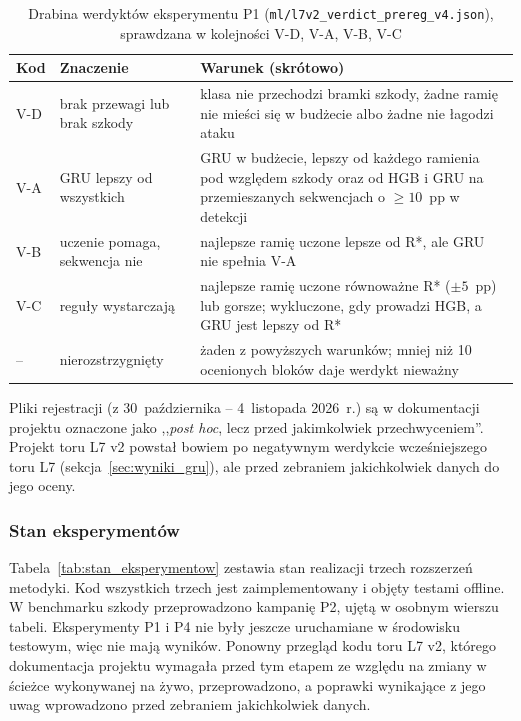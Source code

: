 \documentclass[a4paper,12pt]{article}
\begin{document}
\begin{table}[H]
\centering
\small
\caption{Drabina werdyktów eksperymentu P1 (\texttt{ml/l7v2\_verdict\_prereg\_v4.json}), sprawdzana w kolejności V-D, V-A, V-B, V-C}\label{tab:p1_werdykty}
\begin{tabularx}{\linewidth}{@{}L{1.0cm}L{4.0cm}Y@{}}
\toprule
Kod & Znaczenie & Warunek (skrótowo) \\
\midrule
V-D & brak przewagi lub brak szkody & klasa nie przechodzi bramki szkody, żadne ramię nie mieści się w budżecie albo żadne nie łagodzi ataku \\
V-A & GRU lepszy od wszystkich & GRU w budżecie, lepszy od każdego ramienia pod względem szkody oraz od HGB i GRU na przemieszanych sekwencjach o $\geq 10$~pp w detekcji \\
V-B & uczenie pomaga, sekwencja nie & najlepsze ramię uczone lepsze od R*, ale GRU nie spełnia V-A \\
V-C & reguły wystarczają & najlepsze ramię uczone równoważne R* ($\pm 5$~pp) lub gorsze; wykluczone, gdy prowadzi HGB, a GRU jest lepszy od R* \\
-- & nierozstrzygnięty & żaden z powyższych warunków; mniej niż 10 ocenionych bloków daje werdykt nieważny \\
\bottomrule
\end{tabularx}
\end{table}

Pliki rejestracji (z 30~października -- 4~listopada 2026~r.) są w dokumentacji projektu oznaczone jako ,,\textit{post hoc}, lecz przed jakimkolwiek przechwyceniem''. Projekt toru L7 v2 powstał bowiem po negatywnym werdykcie wcześniejszego toru L7 (sekcja~\ref{sec:wyniki_gru}), ale przed zebraniem jakichkolwiek danych do jego oceny.

\subsubsection{Stan eksperymentów}\label{sec:stan_eksperymentow}
Tabela~\ref{tab:stan_eksperymentow} zestawia stan realizacji trzech rozszerzeń metodyki. Kod wszystkich trzech jest zaimplementowany i objęty testami offline. W benchmarku szkody przeprowadzono kampanię P2, ujętą w osobnym wierszu tabeli. Eksperymenty P1 i P4 nie były jeszcze uruchamiane w środowisku testowym, więc nie mają wyników. Ponowny przegląd kodu toru L7 v2, którego dokumentacja projektu wymagała przed tym etapem ze względu na zmiany w ścieżce wykonywanej na żywo, przeprowadzono, a poprawki wynikające z jego uwag wprowadzono przed zebraniem jakichkolwiek danych.
\end{document}
